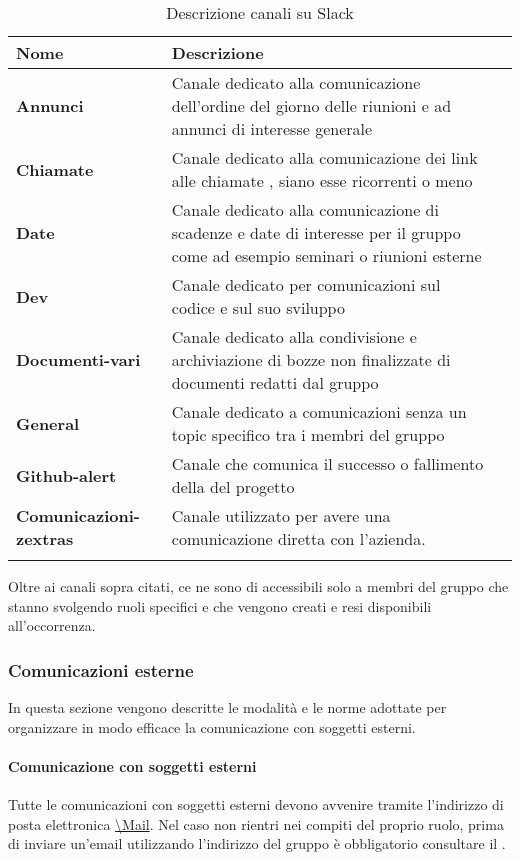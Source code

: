 \setlength{\freewidth}{\dimexpr\textwidth-0\tabcolsep}
	\renewcommand{\arraystretch}{1.5}
	\setlength{\aboverulesep}{0pt}
	\setlength{\belowrulesep}{0pt}
	\begin{longtable}{L{.210\freewidth} L{.6\freewidth} L{.080\freewidth}}
		\textbf{Nome} & \textbf{Descrizione} \\
		\toprule
		\endhead		
		\textbf{Annunci} & Canale dedicato alla comunicazione dell'ordine del giorno delle riunioni e ad annunci di interesse generale \\
		\textbf{Chiamate} & Canale dedicato alla comunicazione dei link alle chiamate , siano esse ricorrenti o meno \\
		 \textbf{Date} & Canale dedicato alla comunicazione di scadenze e date di interesse per il gruppo come ad esempio seminari o riunioni esterne \\
		 \textbf{Dev} & Canale dedicato per comunicazioni sul codice e sul suo sviluppo \\
		\textbf{Documenti-vari} & Canale dedicato alla condivisione e archiviazione di bozze non finalizzate di documenti redatti dal gruppo \\
		 \textbf{General} & Canale dedicato a comunicazioni senza un topic specifico tra i membri del gruppo \\
		 \textbf{Github-alert} & Canale che comunica il successo o fallimento della  del progetto \\
		 \textbf{Comunicazioni-zextras} & Canale utilizzato per avere una comunicazione diretta con l'azienda. \\
		\bottomrule
		\hiderowcolors
		\caption{Descrizione canali su Slack}
	\end{longtable}
Oltre ai canali sopra citati, ce ne sono di accessibili solo a membri del gruppo che stanno svolgendo ruoli specifici e che vengono creati e resi disponibili all'occorrenza.
\subsubsection{Comunicazioni esterne}
In questa sezione vengono descritte le modalità e le norme adottate per organizzare in modo efficace la comunicazione con soggetti esterni.
\paragraph*{Comunicazione con soggetti esterni}
Tutte le comunicazioni con soggetti esterni devono avvenire tramite l'indirizzo di posta elettronica \url{\Mail}. Nel caso non rientri nei compiti del proprio ruolo, prima di inviare un'email utilizzando l'indirizzo del gruppo è obbligatorio consultare il \RdP{}.
